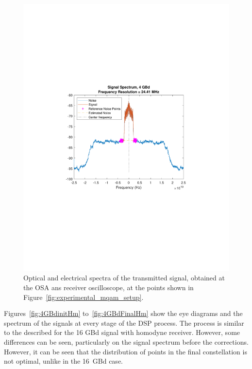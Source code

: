 \begin{refsection}
\begin{figure}[H]
\begin{minipage}{0.43\textwidth}
		\includegraphics[clip, trim=4cm 8cm 4cm 8cm, width=1\textwidth]{./sdf/m_qam_system/figures/expResults/homodyne/4GBdSpectrum.pdf}
		\caption{}
		\label{fig:4GBdSpectHm}
	\end{minipage}
	\caption{Optical and electrical spectra of the transmitted signal, obtained at the OSA ans receiver oscilloscope, at the points shown in Figure~\ref{fig:experimental_mqam_setup}.}
\end{figure}



Figures~\ref{fig:4GBdinitHm} to~\ref{fig:4GBdFinalHm} show the eye diagrams and the spectrum of the signals at every stage of the DSP process. The process is similar to the described for the 16 GBd signal with homodyne receiver. However, some differences can be seen, particularly on the signal spectrum before the corrections. However, it can be seen that the distribution of points in the final constellation is not optimal, unlike in the 16~GBd case.



\end{refsection}
